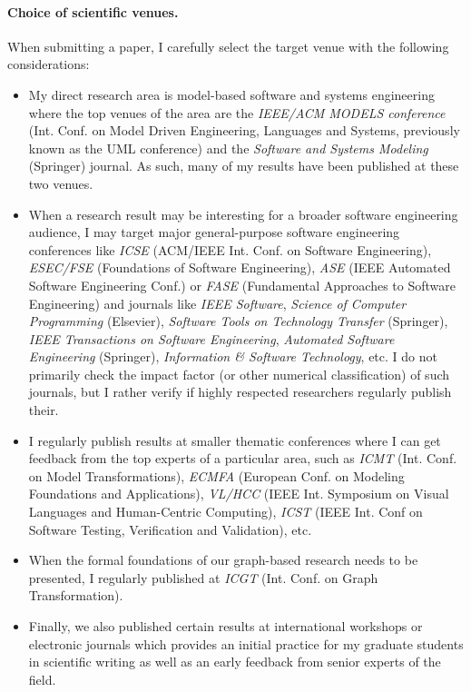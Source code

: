 \paragraph{Choice of scientific venues.} 
When submitting a paper, I carefully select the target venue with the following considerations: 
\begin{itemize}[leftmargin=0.5cm]
\item My direct research area is model-based software and systems engineering where the top venues of the area are the \emph{IEEE/ACM MODELS conference} (Int. Conf. on Model Driven Engineering, Languages and Systems, previously known as the UML conference) and the \emph{Software and Systems Modeling} (Springer) journal. As such, many of my results have been published at these two venues. 
\item When a research result may be interesting for a broader software engineering audience, I may target major general-purpose software engineering conferences like \emph{ICSE} (ACM/IEEE Int. Conf. on Software Engineering), \emph{ESEC/FSE} (Foundations of Software Engineering),  \emph{ASE} (IEEE Automated Software Engineering Conf.) or \emph{FASE} (Fundamental Approaches to Software Engineering) and journals like \emph{IEEE Software}, \emph{Science of Computer Programming} (Elsevier), \emph{Software Tools on Technology Transfer} (Springer), \emph{IEEE Transactions on Software Engineering}, \emph{Automated Software Engineering} (Springer), \emph{Information \& Software Technology}, etc. I do not primarily check the impact factor (or other numerical classification) of such journals, but I rather verify if highly respected researchers regularly publish their.
\item I regularly publish results at smaller thematic conferences where I can get feedback from the top experts of a particular area, such as \emph{ICMT} (Int. Conf. on Model Transformations), \emph{ECMFA} (European Conf. on Modeling Foundations and Applications), \emph{VL/HCC} (IEEE Int. Symposium on Visual Languages and Human-Centric Computing), \emph{ICST} (IEEE Int. Conf on Software Testing, Verification and Validation), etc. 
\item When the formal foundations of our graph-based research needs to be presented, I regularly published at \emph{ICGT} (Int. Conf. on Graph Transformation).
\item Finally, we also published certain results at international workshops or electronic journals which provides an initial practice for my graduate students in scientific writing as well as an early feedback from senior experts of the field. 
\end{itemize}

